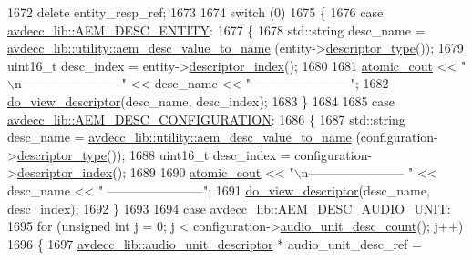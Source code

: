 \begin{DoxyCode}
1672     \textcolor{keyword}{delete} entity\_resp\_ref;
1673 
1674     \textcolor{keywordflow}{switch} (0)
1675     \{
1676     \textcolor{keywordflow}{case} \hyperlink{namespaceavdecc__lib_ac7b7d227e46bc72b63ee9e9aae15902fac9ebb31a55e5894637f6c3c710ceceaf}{avdecc\_lib::AEM\_DESC\_ENTITY}:
1677     \{
1678         std::string desc\_name = \hyperlink{namespaceavdecc__lib_1_1utility_a6bdd02679e5a911a071d4aa03be341f0}{avdecc\_lib::utility::aem\_desc\_value\_to\_name}
      (entity->\hyperlink{classavdecc__lib_1_1descriptor__base_a5112b70022171063ec5d3242bee9910e}{descriptor\_type}());
1679         uint16\_t desc\_index = entity->\hyperlink{classavdecc__lib_1_1descriptor__base_a7eed5583bffdf72d89021b188648c1b5}{descriptor\_index}();
1680 
1681         \hyperlink{cmd__line_8h_a0bc38ccc65c79ba06c6fcd7b4bf554c3}{atomic\_cout} << \textcolor{stringliteral}{"\(\backslash\)n----------------------- "} << desc\_name << \textcolor{stringliteral}{" -----------------------"};
1682         \hyperlink{classcmd__line_aef7d9f8c4eff85c46e5b7aea0961bb51}{do\_view\_descriptor}(desc\_name, desc\_index);
1683     \}
1684 
1685     \textcolor{keywordflow}{case} \hyperlink{namespaceavdecc__lib_ac7b7d227e46bc72b63ee9e9aae15902fab391827cda146b0d4199adf80f47117a}{avdecc\_lib::AEM\_DESC\_CONFIGURATION}:
1686     \{
1687         std::string desc\_name = \hyperlink{namespaceavdecc__lib_1_1utility_a6bdd02679e5a911a071d4aa03be341f0}{avdecc\_lib::utility::aem\_desc\_value\_to\_name}
      (configuration->\hyperlink{classavdecc__lib_1_1descriptor__base_a5112b70022171063ec5d3242bee9910e}{descriptor\_type}());
1688         uint16\_t desc\_index = configuration->\hyperlink{classavdecc__lib_1_1descriptor__base_a7eed5583bffdf72d89021b188648c1b5}{descriptor\_index}();
1689 
1690         \hyperlink{cmd__line_8h_a0bc38ccc65c79ba06c6fcd7b4bf554c3}{atomic\_cout} << \textcolor{stringliteral}{"\(\backslash\)n----------------------- "} << desc\_name << \textcolor{stringliteral}{" -----------------------"};
1691         \hyperlink{classcmd__line_aef7d9f8c4eff85c46e5b7aea0961bb51}{do\_view\_descriptor}(desc\_name, desc\_index);
1692     \}
1693 
1694     \textcolor{keywordflow}{case} \hyperlink{namespaceavdecc__lib_ac7b7d227e46bc72b63ee9e9aae15902fa141a799bfb339b5ff7543722da1119e2}{avdecc\_lib::AEM\_DESC\_AUDIO\_UNIT}:
1695         \textcolor{keywordflow}{for} (\textcolor{keywordtype}{unsigned} \textcolor{keywordtype}{int} j = 0; j < configuration->\hyperlink{classavdecc__lib_1_1configuration__descriptor_a1b8da825afb3257bca8a6506b9f021c9}{audio\_unit\_desc\_count}(); j++)
1696         \{
1697             \hyperlink{classavdecc__lib_1_1audio__unit__descriptor}{avdecc\_lib::audio\_unit\_descriptor} * audio\_unit\_desc\_ref = 

\end{DoxyCode}
